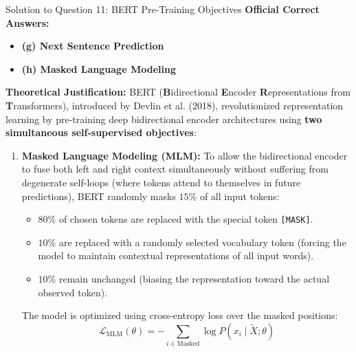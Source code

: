\documentclass[11pt,a4paper]{article}
\begin{document}
\newpage

\begin{solutionbox}{Solution to Question 11: BERT Pre-Training Objectives}
\textbf{Official Correct Answers:}
\begin{itemize}[leftmargin=2em]
    \item \textbf{(g) Next Sentence Prediction}
    \item \textbf{(h) Masked Language Modeling}
\end{itemize}

\medskip
\textbf{Theoretical Justification:}
BERT (\textbf{B}idirectional \textbf{E}ncoder \textbf{R}epresentations from \textbf{T}ransformers), introduced by Devlin et al. (2018), revolutionized representation learning by pre-training deep bidirectional encoder architectures using \textbf{two simultaneous self-supervised objectives}:

\begin{enumerate}[label=\arabic*.,leftmargin=2em]
    \item \textbf{Masked Language Modeling (MLM):}
    To allow the bidirectional encoder to fuse both left and right context simultaneously without suffering from degenerate self-loops (where tokens attend to themselves in future predictions), BERT randomly masks $15\%$ of all input tokens:
    \begin{itemize}
        \item $80\%$ of chosen tokens are replaced with the special token \texttt{[MASK]}.
        \item $10\%$ are replaced with a randomly selected vocabulary token (forcing the model to maintain contextual representations of all input words).
        \item $10\%$ remain unchanged (biasing the representation toward the actual observed token).
    \end{itemize}
    The model is optimized using cross-entropy loss over the masked positions:
    \begin{equation}
        \mathcal{L}_{\text{MLM}}(\theta) = -\sum_{i \in \text{Masked}} \log P(x_i \mid \tilde{X}; \theta)
    \end{equation}


\end{enumerate}
\end{solutionbox}
\end{document}
